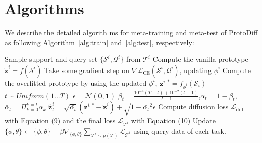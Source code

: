 

\section{Algorithms}
We describe the detailed algorith ms for meta-training and meta-test of ProtoDiff as following Algorithm~\ref{alg:train} and~\ref{alg:test}, respectively:

\begin{algorithm}[ht]
\caption{Meta-training phase of ProtoDiff. \\ \textbf{Input:} $p(\mathcal{T})$: distribution over tasks; $\theta$: diffusion parameters; $\phi$: feature extractor parameters; $T$:  diffusion steps.\\
\textbf{Output:} $\mathbf{z}_{\theta}$: diffusion network, $f_{\phi}$: feature extractor.}
\label{alg:train}
\begin{algorithmic}[1]
\REPEAT
\STATE {}
\STATE Sample support and query set $\{\mathcal{S}^i, \mathcal{Q}^i\}$ from $\mathcal{T}^i$
\STATE Compute the vanilla prototype $\tilde{\mathbf{z}}^i = f(\mathcal{S}^i)$
\REPEAT
    \STATE Take some gradient step on $\nabla \mathcal{L}_{\mathrm{CE}}(\mathcal{S}^i, \mathcal{Q}^i)$, updating $\phi^i$ 
\STATE Compute the overfitted prototype by using the updated $\phi^i$, $\mathbf{z}^{i, *} = f_{\phi^i}(\mathcal{S}_i)$
    \STATE $t \sim Uniform({1...T})$
\STATE $\epsilon = \mathcal{N}(\mathbf{0},\mathbf{1})$
\STATE $\beta_t = \frac{10^{-4}(T-t) + 10^{-2}(t-1)}{T-1}$,$\alpha_t = 1-\beta_t$,
$\bar{\alpha}_t = \Pi_{k=0}^{k=t} \alpha_k $
\STATE $\hat{\mathbf{z}}_t^i = \sqrt{\bar{\alpha_t}}(\mathbf{z}^{i, *} - \tilde{\mathbf{z}}^i) + \sqrt{1-\bar{\alpha_t}^2}\epsilon$  
\STATE Compute diffusion loss $\mathcal{L}_{\mathrm{diff}}$ with Equation (9) and the final loss $\mathcal{L}_{\mathcal{T}^i}$ with Equation (10)
\STATE Update $\{\phi, \theta\} \leftarrow \{\phi, \theta\} - \beta \nabla_{\{\phi, \theta\}} \sum_{\mathcal{T}^i \sim p(\mathcal{T})} \mathcal{L}_{\mathcal{T}^i}$ using query data of each task.
\ENDFOR
{}
\end{algorithmic}
\end{algorithm}


